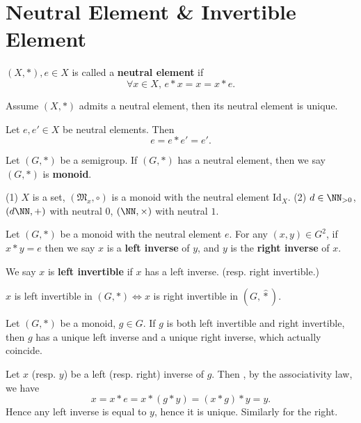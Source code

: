 \section{Neutral Element \& Invertible Element}
\begin{definitionenv}
    $(X, *), e\in X$ is called a \textbf{neutral element} if 
    $$\forall x\in X, \,  e*x=x=x*e.$$
\end{definitionenv}
\begin{propositionenv}
    Assume $(X, *)$ admits a neutral element,  then its neutral element is unique.
\end{propositionenv}
\begin{proofenv}
    Let $e, e'\in X$ be neutral elements. Then 
    $$e=e*e'=e'.$$
\end{proofenv}
\begin{definitionenv}
    Let $(G, *)$ be a semigroup. If $(G, *)$ has a neutral element, then we say $(G, *)$ is \textbf{monoid}.
\end{definitionenv}
\begin{exampleenv}
    \quad
    \newline
    (1) $X$ is a set,  $(\mathfrak{M} _x, \circ)$ is a monoid with the neutral element $\mathrm{Id}_X$.
    \newline
    (2) $d\in \NN_{>0}$, $(d\NN, +)$ with neutral $0$, $(\NN, \times)$ with neutral $1$.
\end{exampleenv}
\begin{definitionenv}
    Let $(G, *)$ be a monoid with the neutral element $e$. For any $ (x, y)\in G^2$,  if $x*y=e$ then we say $x$ is a \textbf{left inverse} of $y$,  and $y$ is the \textbf{right inverse} of $x$.
\end{definitionenv}
\begin{remark}
    We say $x$ is \textbf{left invertible} if $x$ has a left inverse. (resp. right invertible.)
\end{remark}
\begin{remark}
    $x$ is left invertible in $(G, *)\Leftrightarrow x $ is right invertible in $(G, \hat{*})$.
\end{remark}
\begin{propositionenv}
    Let $(G, *)$ be a monoid,  $g\in G$. If $g$ is both left invertible and right invertible,  then $g$ has a unique left inverse and a unique right inverse, which actually coincide.
\end{propositionenv}
\begin{proofenv}
    Let $x$ (resp. $y$) be a left (resp. right) inverse of $g$. Then ,  by the associativity law,  we have 
    $$x=x*e=x*(g*y)=(x*g)*y=y.$$
    Hence any left inverse is equal to $y$,  hence it is unique. Similarly for the right.
\end{proofenv}
